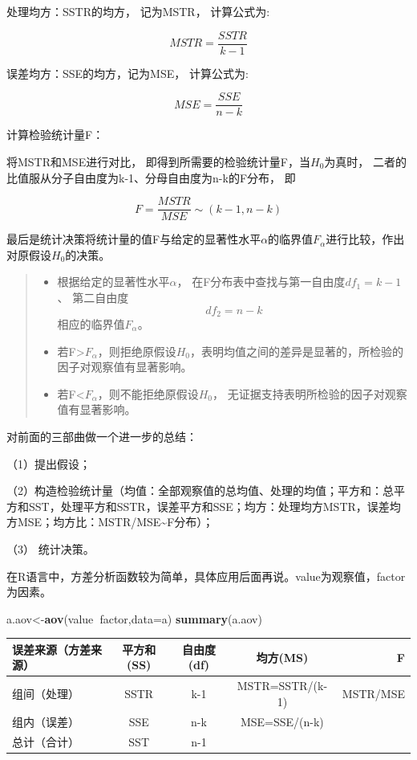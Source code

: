 \documentclass[]{ctexbook}
\newenvironment{Shaded}{\begin{snugshade}}{\end{snugshade}}
\newcommand{\DataTypeTok}[1]{\textcolor[rgb]{0.13,0.29,0.53}{#1}}
\newcommand{\KeywordTok}[1]{\textcolor[rgb]{0.13,0.29,0.53}{\textbf{#1}}}
\newcommand{\NormalTok}[1]{#1}
\newcommand{\OperatorTok}[1]{\textcolor[rgb]{0.81,0.36,0.00}{\textbf{#1}}}
\providecommand{\tightlist}{%
  \setlength{\itemsep}{0pt}\setlength{\parskip}{0pt}}
\begin{document}
处理均方：SSTR的均方， 记为MSTR， 计算公式为:

\[MSTR=\frac{SSTR}{k-1}\]

误差均方：SSE的均方，记为MSE， 计算公式为:

\[MSE=\frac{SSE}{n-k}\]

计算检验统计量F：

将MSTR和MSE进行对比， 即得到所需要的检验统计量F，当\(H_0\)为真时， 二者的比值服从分子自由度为k-1、分母自由度为n-k的F分布， 即

\[F=\frac{MSTR}{MSE}\sim(k-1,n-k)\]

最后是统计决策将统计量的值F与给定的显著性水平\(\alpha\)的临界值\(F_\alpha\)进行比较，作出对原假设\(H_0\)的决策。

\begin{quote}
\begin{itemize}
\tightlist
\item
  根据给定的显著性水平\(\alpha\)， 在F分布表中查找与第一自由度\(df_1=k-1\)、 第二自由度\[df_2=n-k\] 相应的临界值\(F_\alpha\)。
\item
  若F\textgreater{}\(F_\alpha\)，则拒绝原假设\(H_0\)，表明均值之间的差异是显著的，所检验的因子对观察值有显著影响。
\item
  若F\textless{}\(F_\alpha\)，则不能拒绝原假设\(H_0\)， 无证据支持表明所检验的因子对观察值有显著影响。
\end{itemize}
\end{quote}

对前面的三部曲做一个进一步的总结：

（1）提出假设；

（2）构造检验统计量（均值：全部观察值的总均值、处理的均值；平方和：总平方和SST，处理平方和SSTR，误差平方和SSE；均方：处理均方MSTR，误差均方MSE；均方比：MSTR/MSE\textasciitilde F分布）；

（3） 统计决策。

在R语言中，方差分析函数较为简单，具体应用后面再说。value为观察值，factor为因素。

\begin{Shaded}
\begin{Highlighting}[]
\NormalTok{a.aov<-}\KeywordTok{aov}\NormalTok{(value}\OperatorTok{~}\NormalTok{factor,}\DataTypeTok{data=}\NormalTok{a)}
\KeywordTok{summary}\NormalTok{(a.aov)}
\end{Highlighting}
\end{Shaded}

\begin{longtable}[]{@{}lcccr@{}}
\toprule
误差来源（方差来源） & 平方和(SS) & 自由度(df) & 均方(MS) & F\tabularnewline
\midrule
\endhead
组间（处理） & SSTR & k-1 & MSTR=SSTR/(k-1) & MSTR/MSE\tabularnewline
组内（误差） & SSE & n-k & MSE=SSE/(n-k) &\tabularnewline
总计（合计） & SST & n-1 & &\tabularnewline
\bottomrule
\end{longtable}
\end{document}
